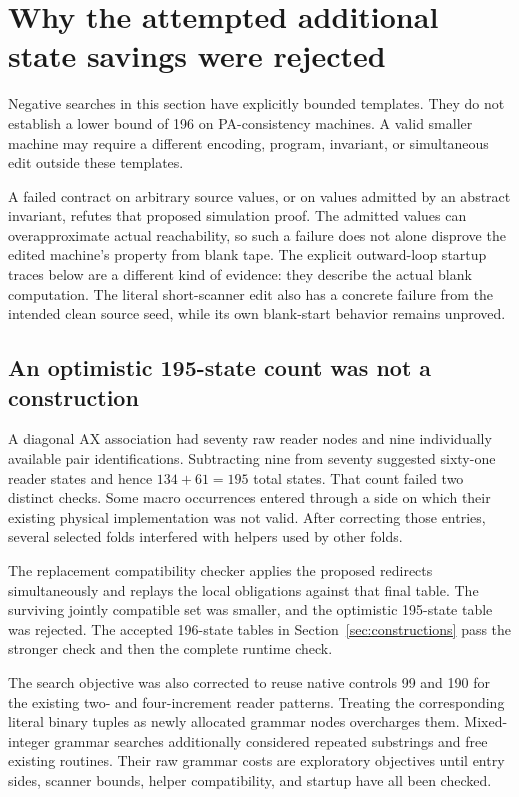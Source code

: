 \section{Why the attempted additional state savings were rejected}
\label{sec:experiments}
Negative searches in this section have explicitly bounded templates. They do not establish a lower bound of 196 on PA-consistency machines. A valid smaller machine may require a different encoding, program, invariant, or simultaneous edit outside these templates.

A failed contract on arbitrary source values, or on values admitted by an abstract invariant, refutes that proposed simulation proof. The admitted values can overapproximate actual reachability, so such a failure does not alone disprove the edited machine's property from blank tape. The explicit outward-loop startup traces below are a different kind of evidence: they describe the actual blank computation. The literal short-scanner edit also has a concrete failure from the intended clean source seed, while its own blank-start behavior remains unproved.

\subsection{An optimistic 195-state count was not a construction}
A diagonal AX association had seventy raw reader nodes and nine individually available pair identifications. Subtracting nine from seventy suggested sixty-one reader states and hence $134+61=195$ total states. That count failed two distinct checks. Some macro occurrences entered through a side on which their existing physical implementation was not valid. After correcting those entries, several selected folds interfered with helpers used by other folds.

The replacement compatibility checker applies the proposed redirects simultaneously and replays the local obligations against that final table. The surviving jointly compatible set was smaller, and the optimistic 195-state table was rejected. The accepted 196-state tables in Section~\ref{sec:constructions} pass the stronger check and then the complete runtime check.

The search objective was also corrected to reuse native controls 99 and 190 for the existing two- and four-increment reader patterns. Treating the corresponding literal binary tuples as newly allocated grammar nodes overcharges them. Mixed-integer grammar searches additionally considered repeated substrings and free existing routines. Their raw grammar costs are exploratory objectives until entry sides, scanner bounds, helper compatibility, and startup have all been checked.

